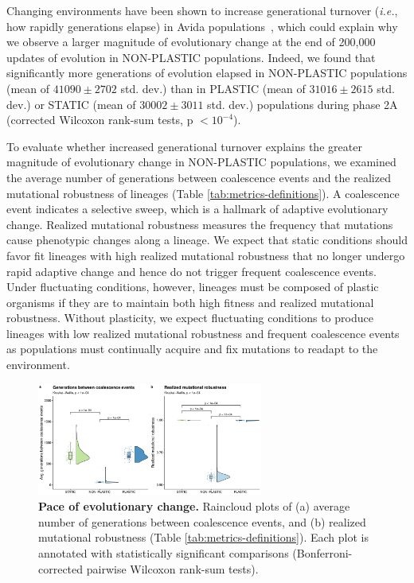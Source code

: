 \documentclass[utf8]{frontiersSCNS} %
\begin{document}
\begin{raggedbottom}
Changing environments have been shown to increase generational turnover (\textit{i.e.}, how rapidly generations elapse) in Avida populations~\citep{canino-koning_evolution_2016}, which could explain why we observe a larger magnitude of evolutionary change at the end of 200,000 updates of evolution in NON-PLASTIC populations.
Indeed, we found that significantly more generations of evolution elapsed in NON-PLASTIC populations (mean of $41090\pm2702$ std. dev.) than in PLASTIC (mean of $31016\pm2615$ std. dev.) or STATIC (mean of $30002\pm3011$ std. dev.) populations during phase 2A (corrected Wilcoxon rank-sum tests, p $<10^{-4}$).

To evaluate whether increased generational turnover explains the greater magnitude of evolutionary change in NON-PLASTIC populations, we examined the average number of generations between coalescence events and the realized mutational robustness of lineages (Table \ref{tab:metrics-definitions}).
A coalescence event indicates a selective sweep, which is a hallmark of adaptive evolutionary change.
Realized mutational robustness measures the frequency that mutations cause phenotypic changes along a lineage.
We expect that static conditions should favor fit lineages with high realized mutational robustness that no longer undergo rapid adaptive change and hence do not trigger frequent coalescence events.
Under fluctuating conditions, however, lineages must be composed of plastic organisms if they are to maintain both high fitness and realized mutational robustness.
Without plasticity, we expect fluctuating conditions to produce lineages with low realized mutational robustness and frequent coalescence events as populations must continually acquire and fix mutations to readapt to the environment.

\begin{figure}[h!]
  \centering
  \includegraphics[width=0.66\textwidth]{media-evolutionary-change-pace-panel.pdf}
  \caption{\small
  \textbf{Pace of evolutionary change.}
  Raincloud plots of
  (a) average number of generations between coalescence events,
  and (b) realized mutational robustness (Table \ref{tab:metrics-definitions}).
  Each plot is annotated with statistically significant comparisons (Bonferroni-corrected pairwise Wilcoxon rank-sum tests).
  }
  \label{fig:evolutionary-dynamics-rate}
\end{figure}


\end{raggedbottom}
\end{document}
